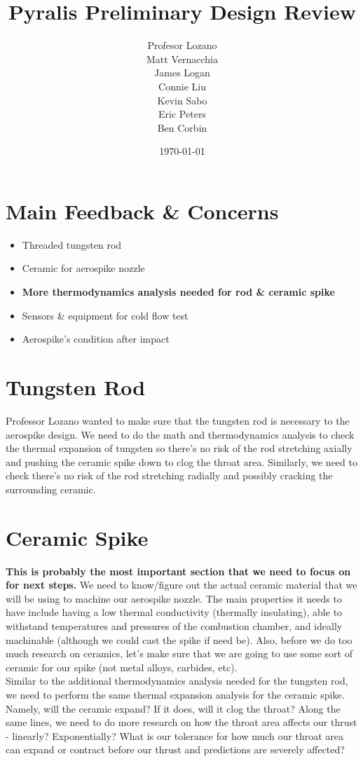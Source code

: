 \documentclass[12pt]{article}
\title{Pyralis Preliminary Design Review} %
\author{Profesor Lozano\\Matt Vernacchia\\James Logan\\Connie Liu\\Kevin Sabo\\Eric Peters\\Ben Corbin }
\date{ \today } %
\begin{document}
\maketitle

\section*{Main Feedback \& Concerns}

\begin{itemize}
\item Threaded tungsten rod
\item Ceramic for aerospike nozzle
\item \textbf{More thermodynamics analysis needed for rod \& ceramic spike}
\item Sensors \& equipment for cold flow test
\item Aerospike's condition after impact
\end{itemize}

\section{Tungsten Rod}
Professor Lozano wanted to make sure that the tungsten rod is necessary to the aerospike design. We need to do the math and thermodynamics analysis to check the thermal expansion of tungsten so there's no risk of the rod stretching axially and pushing the ceramic spike down to clog the throat area. Similarly, we need to check there's no risk of the rod stretching radially and possibly cracking the surrounding ceramic.

\section{Ceramic Spike}
\textbf{This is probably the most important section that we need to focus on for next steps.} We need to know/figure out the actual ceramic material that we will be using to machine our aerospike nozzle. The main properties it needs to have include having a low thermal conductivity (thermally insulating), able to withstand temperatures and pressures of the combustion chamber, and ideally machinable (although we could cast the spike if need be). Also, before we do too much research on ceramics, let's make sure that we are going to use some sort of ceramic for our spike (not metal alloys, carbides, etc).\\

\noindent Similar to the additional thermodynamics analysis needed for the tungsten rod, we need to perform the same thermal expansion analysis for the ceramic spike. Namely, will the ceramic expand? If it does, will it clog the throat? Along the same lines, we need to do more research on how the throat area affects our thrust - linearly? Exponentially? What is our tolerance for how much our throat area can expand or contract before our thrust and predictions are severely affected?
\end{document}
